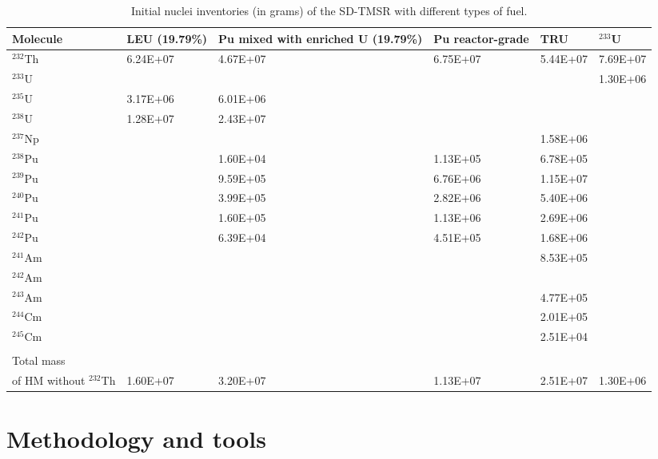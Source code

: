 \begin{table}  %
	\caption{Initial nuclei inventories (in grams) of the SD-TMSR with different types of fuel.}
	\vspace{0.1in}
	\begin{tabularx}{\textwidth}{s s s s s s}
		\hline
		\vspace{0.1in}
		Molecule& \gls{LEU} (19.79\%) & Pu mixed with enriched U (19.79\%) & Pu reactor-grade & \gls{TRU}& $^{233}$U \\
		\hline
		$^{232}$Th       &6.24E+07 & 4.67E+07 &   6.75E+07			& 5.44E+07	& 7.69E+07    \\ 
		$^{233}$U        &         & &        &       &  1.30E+06 \\
		$^{235}$U        & 3.17E+06 &6.01E+06	&            &   & \\
		$^{238}$U      	 &1.28E+07  &2.43E+07 &	&  &\\
		$^{237}$Np	  	 &         && &1.58E+06	&    \\
		$^{238}$Pu	  	 &         &1.60E+04	& 1.13E+05 & 6.78E+05	&   \\
		$^{239}$Pu       &         &9.59E+05&6.76E+06& 1.15E+07&    \\
		$^{240}$Pu       &         &3.99E+05& 2.82E+06&5.40E+06&  	\\  
		$^{241}$Pu		 &         &1.60E+05&1.13E+06&2.69E+06&   \\
		$^{242}$Pu		 &         &6.39E+04	&4.51E+05	& 1.68E+06& \\
		$^{241}$Am		 &         &&& 8.53E+05 & \\
		$^{242}$Am		 &         &&&  &\\
		$^{243}$Am       &        & &&4.77E+05&\\
		$^{244}$Cm		 &        & &&2.01E+05&  \\
		$^{245}$Cm		 &        & &&			2.51E+04	&   \\
		&         &&		&		&\\
		Total mass \\of HM without $^{232}$Th	& 1.60E+07& 3.20E+07&1.13E+07&  2.51E+07&   1.30E+06  \\
		\hline
	\end{tabularx}
\label{tab:table5}
\end{table}


\section{Methodology and tools}

